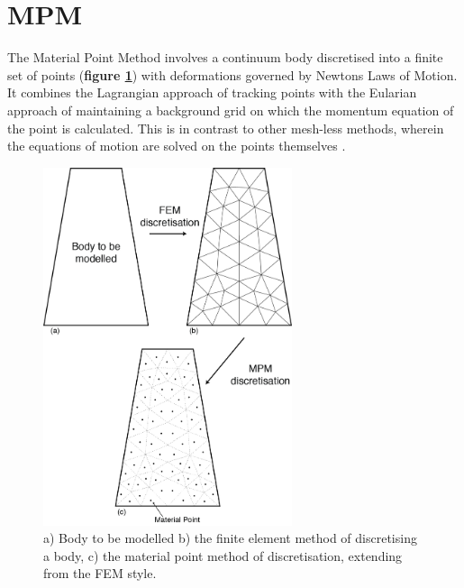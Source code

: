 \section{MPM}
The Material Point Method \citep{sulsky94,sulsky95} involves a continuum body discretised into a finite set of points ({\bfseries figure \ref{fig:discrete}}) with deformations governed by Newtons Laws of Motion. It combines the Lagrangian approach of tracking points with the Eularian approach of maintaining a background grid on which the momentum equation of the point is calculated. This is in contrast to other mesh-less methods, wherein the equations of motion are solved on the points themselves \citep{Krishna,Samila}.
\begin{figure}[H]
\centering
\includegraphics[width=0.65\textwidth]{discrete.png}
\caption{\label{fig:discrete}a) Body to be modelled b) the finite element method of discretising a body, c) the material point method of discretisation, extending from the FEM style.}
\end{figure}

